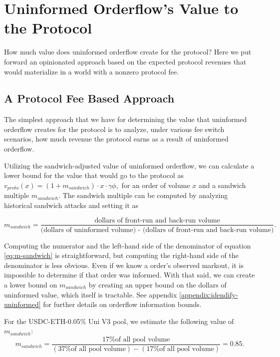 \section{Uninformed Orderflow's Value to the Protocol} \label{section:protocol-lpcapital-value}

How much value does uninformed orderflow create for the protocol? Here we put forward an opinionated approach based on the expected protocol revenues that would materialize in a world with a nonzero protocol fee.

\subsection{A Protocol Fee Based Approach}

    The simplest approach that we have for determining the value that uninformed orderflow creates for the protocol is to analyze, under various fee switch scenarios, how much revenue the protocol earns as a result of uninformed orderflow.


    Utilizing the sandwich-adjusted value of uninformed orderflow, we can calculate a lower bound for the value that would go to the protocol as
        $v_{proto}(x) = (1+m_{sandwich}) \cdot x \cdot \gamma \phi,$
    for an order of volume $x$ and a sandwich multiple $m_{sandwich}$. The sandwich multiple can be computed by analyzing historical sandwich attacks and setting it as 

    \begin{equation} \label{eq:m-sandwich}
        m_{sandwich} = \frac{\text{dollars of front-run and back-run volume}}{\text{(dollars of uninformed volume) - (dollars of front-run and back-run volume)}}.
    \end{equation}
    
    Computing the numerator and the left-hand side of the denominator of equation \ref{eq:m-sandwich} is straightforward, but computing the right-hand side of the denominator is less obvious. Even if we know a order's observed markout, it is impossible to determine if that order was informed. With that said, we can create a lower bound on $m_{sandwich}$ by creating an upper bound on the dollars of uninformed value, which itself is tractable. See appendix \ref{appendix:idendify-uninformed} for further details on orderflow information bounds.

    For the USDC-ETH-0.05\% Uni V3 pool, we estimate the following value of $m_{sandwich}$:
    \begin{equation}
        m_{sandwich} = \frac{{\text{17\% of all pool volume}}}{(\text{37\% of all pool volume}) - (\text{17\% of all pool volume})} = 0.85.
    \end{equation}
    
